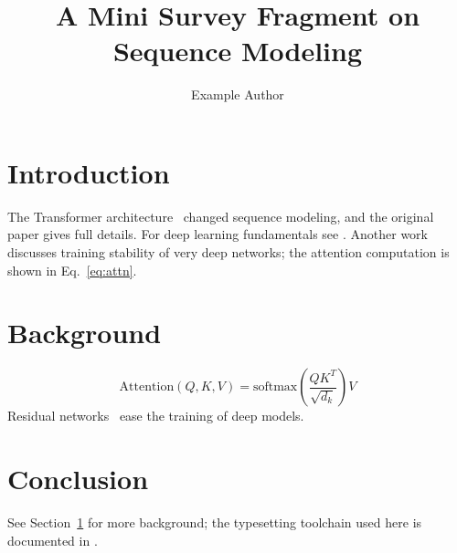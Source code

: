 \documentclass{article}
\title{A Mini Survey Fragment on Sequence Modeling}
\author{Example Author}
\date{}
\begin{document}
\maketitle

\section{Introduction}\label{sec:intro}
The Transformer architecture~\cite{vaswani2017attention} changed sequence
modeling, and the original paper gives full details. For deep learning
fundamentals see \cite{goodfellow2016deep,lecun2015deep}. Another
work~\cite{he2016deep} discusses training stability of very deep networks;
the attention computation is shown in Eq.~\eqref{eq:attn}.

\section{Background}\label{sec:background}
\begin{equation}\label{eq:attn}
  \mathrm{Attention}(Q,K,V) =
  \mathrm{softmax}\!\left(\frac{QK^{T}}{\sqrt{d_k}}\right)V
\end{equation}
Residual networks~\cite{he2016deep} ease the training of deep models.

\section{Conclusion}
See Section~\ref{sec:intro} for more background; the typesetting toolchain
used here is documented in \cite{knuth1984texbook}.



\end{document}
